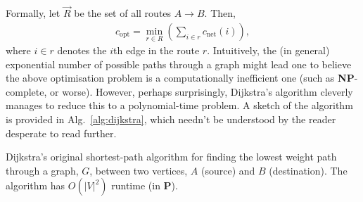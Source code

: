 \documentclass[aps, rmp, twocolumn, amsmath, amssymb, nofootinbib, superscriptaddress, longbibliography, floatfix, table-of-contents, eqsecnum]{revtex4-1}
\newcommand{\comment}[1]{{\color{blue}{\textbf{#1}}}}
\begin{document}
Formally, let $\vec{R}$ be the set of all routes \mbox{$A\to B$}. Then,
\begin{align}
c_\text{opt} = \min_{r\in R} \left(\sum_{i\in r} c_\text{net}(i) \right),
\end{align}
where \mbox{$i\in r$} denotes the $i$th edge in the route $r$. Intuitively, the (in general) exponential number of possible paths through a graph might lead one to believe the above optimisation problem is a computationally inefficient one (such as \textbf{NP}-complete, or worse). However, perhaps surprisingly, Dijkstra's algorithm cleverly manages to reduce this to a polynomial-time problem. A sketch of the algorithm is provided in Alg.~\ref{alg:dijkstra}, which needn't be understood by the reader desperate to read further.

\begin{table}[!htb]
\caption{Dijkstra's original shortest-path algorithm for finding the lowest weight path through a graph, $G$, between two vertices, $A$ (source) and $B$ (destination). The algorithm has $O(|V|^2)$ runtime (in \textbf{P}). \comment{Fix me}} \label{alg:dijkstra}
\end{table}
\end{document}
